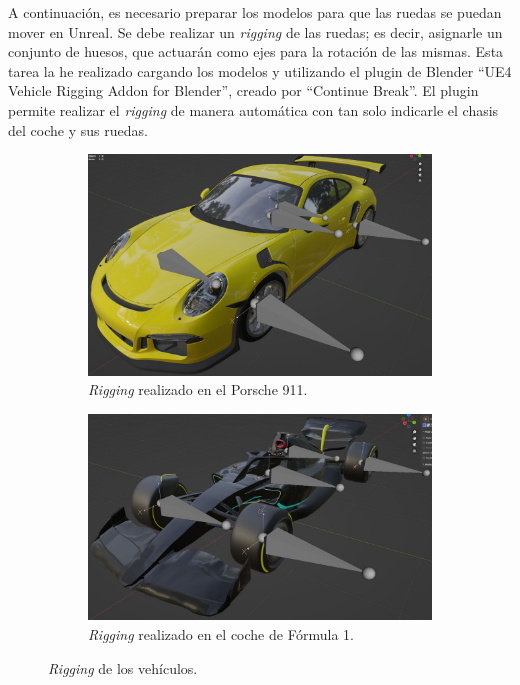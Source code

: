 A continuación, es necesario preparar los modelos para que las ruedas se puedan mover en Unreal. Se debe realizar un \textit{rigging} de las ruedas; es decir, asignarle un conjunto de huesos, que actuarán como ejes para la rotación de las mismas. Esta tarea la he realizado cargando los modelos y utilizando el plugin de Blender ``UE4 Vehicle Rigging Addon for Blender''\cite{blenderplugin}, creado por ``Continue Break''. El plugin permite realizar el \textit{rigging} de manera automática con tan solo indicarle el chasis del coche y sus ruedas.

\begin{figure}[H]
    \centering
\begin{subfigure}[t]{0.48\textwidth}
    \centering
    \includegraphics[width=\textwidth]{imagenes/converted/rigging/911-rigging.jpg}
    \caption{\textit{Rigging} realizado en el Porsche 911.}
    \label{fig:rigging911}
\end{subfigure}
\hfill
\begin{subfigure}[t]{0.48\textwidth}
    \centering
    \includegraphics[width=\textwidth]{imagenes/converted/rigging/f1-rigging.jpg}
    \caption{\textit{Rigging} realizado en el coche de Fórmula 1.}
    \label{fig:riggingf1}
\end{subfigure}
\caption{\textit{Rigging} de los vehículos.}
\end{figure}

